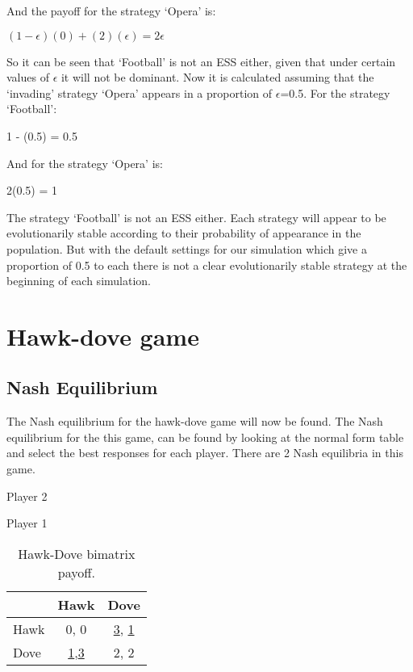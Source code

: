 And the payoff for the strategy `Opera' is:
\begin{center}
$(1-{\epsilon})(0) + (2)({\epsilon}) =  2{\epsilon}$
\end{center}
So it can be seen that `Football' is not an ESS either, given that under certain values of $\epsilon$ it will not be dominant. Now it is calculated assuming that the `invading' strategy `Opera' appears in a proportion of $\epsilon$=0.5. For the strategy `Football':
\begin{center}
1 -  (0.5) = 0.5
\end{center}
And for the strategy `Opera' is:
\begin{center}
 2(0.5)  = 1
\end{center}
The strategy `Football' is not an ESS either. Each strategy will appear to be evolutionarily stable according to their probability of appearance in the population. But with the default settings for our simulation which give a proportion of 0.5 to each there is not a clear evolutionarily stable strategy at the beginning of each simulation.



\section{Hawk-dove game}
\label{app:hdnashess}

\subsection{Nash Equilibrium}
The Nash equilibrium for the hawk-dove game will now be found. The Nash equilibrium for the this game,  can be found by looking at the normal form table and select the best responses for each player. There are 2 Nash equilibria in this game.

\begin{table}[H]
\begin{center}
Player 2

Player 1
\begin{tabular}{|l|c|c|}
\hline
 & Hawk & Dove\\ 
\hline
Hawk & 0, 0 & \underline{3}, \underline{1}\\
\hline
Dove & \underline{1},\underline{3} & 2, 2\\
\hline
\end{tabular}

\caption{ Hawk-Dove bimatrix payoff.}
\label{fig:mpnashhd}	
\end{center}
\end{table}

